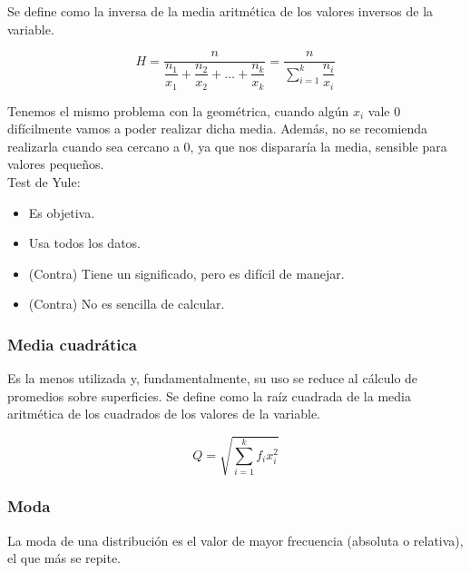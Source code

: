 Se define como la inversa de la media aritmética de los valores inversos de la variable.

$$H = \dfrac{n}{\dfrac{n_1}{x_1} + \dfrac{n_2}{x_2} + \ldots + \dfrac{n_k}{x_k}} = \dfrac{n}{\sum\limits_{i=1}^k \dfrac{n_i}{x_i}}$$

Tenemos el mismo problema con la geométrica, cuando algún $x_i$ vale $0$ difícilmente vamos a poder realizar
dicha media. Además, no se recomienda realizarla cuando sea cercano a 0, ya que nos dispararía la media,
sensible para valores pequeños.\\

\noindent Test de Yule:
\begin{itemize}
    \item Es objetiva.
    \item Usa todos los datos.
    \item (Contra) Tiene un significado, pero es difícil de manejar.
    \item (Contra) No es sencilla de calcular.
\end{itemize}


\subsubsection{Media cuadrática}

Es la menos utilizada y, fundamentalmente, su uso se reduce al cálculo de promedios sobre superficies.
Se define como la raíz cuadrada de la media aritmética de los cuadrados de los valores de la variable.

$$Q = \sqrt{\sum_{i=1}^k f_i x_i^2}$$


\subsubsection{Moda}

La moda de una distribución es el valor de mayor frecuencia (absoluta o relativa), el que más se repite.

